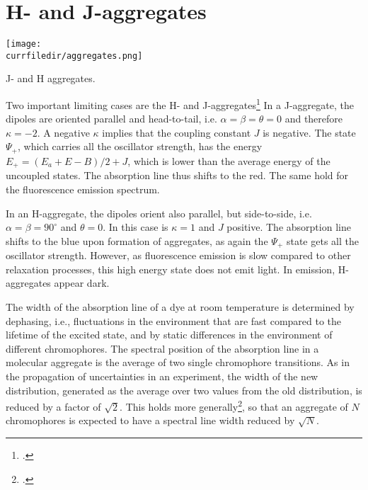 \section{H- and J-aggregates}

\begin{marginfigure}
\texttt{[image: \\currfiledir/aggregates.png]}
\caption{J- and H aggregates.}
\end{marginfigure}


Two important limiting cases are the H- and J-aggregates\footcite[chapters 2.1.4.3, 2.2.5.3]{KoehlerBaessler2015} In a J-aggregate, the dipoles are oriented parallel and head-to-tail, i.e. $\alpha = \beta = \theta = 0$ and therefore $\kappa = -2$. A negative $\kappa$ implies that the coupling constant $J$ is negative. The state $\Psi_+$, which carries all the oscillator strength, has the energy $E_+ = (E_a + E-B) / 2 + J$, which is lower than the average energy of the uncoupled states. The absorption line thus shifts to the red. The same hold for the fluorescence emission spectrum.

In an H-aggregate, the dipoles orient also parallel, but side-to-side, i.e.  $\alpha = \beta = 90^\circ$ and $\theta = 0$. In this case is $\kappa =1$ and $J$ positive. The absorption line shifts to the blue upon formation of aggregates, as again the  $\Psi_+$ state gets all the oscillator strength. However, as fluorescence emission is slow compared to other relaxation processes, this high energy state does not emit light. In emission, H-aggregates appear dark.

The width of the absorption line of a dye at room temperature is determined by dephasing, i.e., fluctuations in the environment that are fast compared to the lifetime of the excited state, and by static differences in the environment of different chromophores. The spectral position of the absorption line in a molecular aggregate is the average of two single chromophore transitions. As in the propagation of uncertainties in an experiment, the width of the new distribution, generated as the average over two values from the old distribution, is reduced by a factor of $\sqrt{2}$. This holds more generally\footcite{Knapp1984}, so that an aggregate of $N$ chromophores is expected to have a spectral line width reduced by $\sqrt{N}$.








\printbibliography[segment=\therefsegment,heading=subbibliography]
